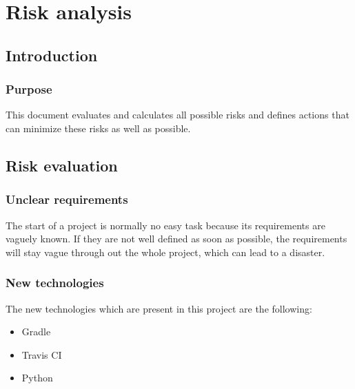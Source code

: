 
\chapter{Risk analysis} %

\label{ChapterX} %



\section{Introduction}

\subsection{Purpose}

This document evaluates and calculates all possible risks and defines actions that can minimize these risks as well as possible.

\section{Risk evaluation}

\subsection{Unclear requirements}

The start of a project is normally no easy task because its requirements are vaguely known. If they are not well defined as soon as possible, the requirements will stay vague through out the whole project, which can lead to a disaster. 

\subsection{New technologies}

The new technologies which are present in this project are the following:

 \begin{itemize}
    \item Gradle
    \item Travis CI
    \item Python
\end{itemize}

